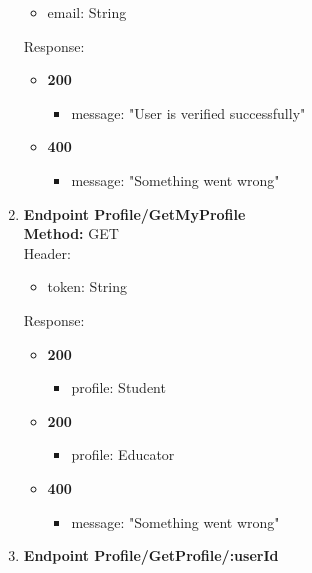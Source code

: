 \begin{enumerate}
    \begin{itemize}
        \item email: String
    \end{itemize}
    Response:\\
    \begin{itemize}
        \item \textbf{200} \\
        \begin{itemize}
            \item message: "User is verified successfully"
        \end{itemize}
                \item \textbf{400} \\
        \begin{itemize}
            \item message: "Something went wrong"
        \end{itemize}
    \end{itemize}
    \item \textbf{Endpoint Profile/GetMyProfile} \\
    \textbf{Method:} GET \\
    Header:\\
    \begin{itemize}
        \item token: String
    \end{itemize}
    Response:\\
    \begin{itemize}
        \item \textbf{200} \\
        \begin{itemize}
            \item profile: Student
        \end{itemize}
        \item \textbf{200} \\
        \begin{itemize}
            \item profile: Educator
        \end{itemize}
        \item \textbf{400} \\
        \begin{itemize}
            \item message: "Something went wrong"
        \end{itemize}
    \end{itemize}
    \item \textbf{Endpoint Profile/GetProfile/:userId} \\

\end{enumerate}
